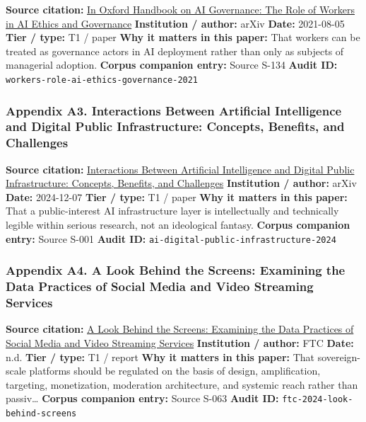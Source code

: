 \documentclass[
  american,
  11pt,
  letterpaper,
]{article}
\begin{document}
\textbf{Source citation:} \href{https://arxiv.org/abs/2108.07700}{In
Oxford Handbook on AI Governance: The Role of Workers in AI Ethics and
Governance} \textbf{Institution / author:} arXiv \textbf{Date:}
2021-08-05 \textbf{Tier / type:} T1 / paper \textbf{Why it matters in
this paper:} That workers can be treated as governance actors in AI
deployment rather than only as subjects of managerial adoption.
\textbf{Corpus companion entry:} Source S-134 \textbf{Audit ID:}
\texttt{workers-role-ai-ethics-governance-2021}

\subsubsection{Appendix A3. Interactions Between Artificial Intelligence
and Digital Public Infrastructure: Concepts, Benefits, and
Challenges}\label{ch-10-appendix-a3-interactions-between-artificial-intelligence-and-digital-public-infrastructure-concepts-benefits-and-challenges}

\textbf{Source citation:}
\href{https://arxiv.org/abs/2412.05761}{Interactions Between Artificial
Intelligence and Digital Public Infrastructure: Concepts, Benefits, and
Challenges} \textbf{Institution / author:} arXiv \textbf{Date:}
2024-12-07 \textbf{Tier / type:} T1 / paper \textbf{Why it matters in
this paper:} That a public-interest AI infrastructure layer is
intellectually and technically legible within serious research, not an
ideological fantasy. \textbf{Corpus companion entry:} Source S-001
\textbf{Audit ID:} \texttt{ai-digital-public-infrastructure-2024}

\subsubsection{Appendix A4. A Look Behind the Screens: Examining the
Data Practices of Social Media and Video Streaming
Services}\label{ch-10-appendix-a4-a-look-behind-the-screens-examining-the-data-practices-of-social-media-and-video-streaming-services}

\textbf{Source citation:}
\href{https://www.ftc.gov/reports/look-behind-screens-examining-data-practices-social-media-video-streaming-services}{A
Look Behind the Screens: Examining the Data Practices of Social Media
and Video Streaming Services} \textbf{Institution / author:} FTC
\textbf{Date:} n.d. \textbf{Tier / type:} T1 / report \textbf{Why it
matters in this paper:} That sovereign-scale platforms should be
regulated on the basis of design, amplification, targeting,
monetization, moderation architecture, and systemic reach rather than
passiv\ldots{} \textbf{Corpus companion entry:} Source S-063
\textbf{Audit ID:} \texttt{ftc-2024-look-behind-screens}
\end{document}
